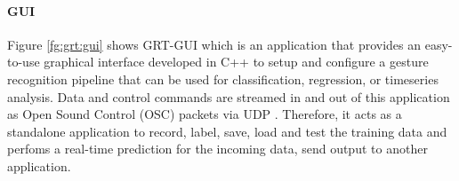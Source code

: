 \paragraph*{GUI} Figure \ref{fg:grt:gui} shows GRT-GUI which is an application that provides an easy-to-use graphical interface developed in C++ to setup and configure a gesture recognition pipeline that can be used for classification, regression, or timeseries analysis. Data and control commands are streamed in and out of this application as Open Sound Control (OSC) packets via UDP . Therefore, it acts as a standalone application to record, label, save, load and test the training data and perfoms a real-time prediction for the incoming data, send output to another application. 

 
